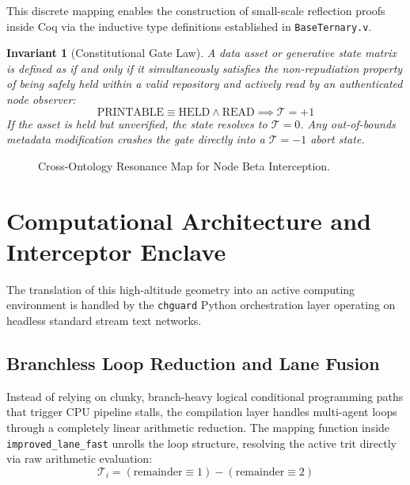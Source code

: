 \documentclass[11pt,oneside,letterpaper]{article}
\newtheorem{invariant}[theorem]{Invariant}
\newcommand{\M}{\mathcal{M}^{80}}
\newcommand{\trit}{\mathcal{T}}
\begin{document}
This discrete mapping enables the construction of small-scale reflection proofs inside Coq via the inductive type definitions established in \texttt{BaseTernary.v}.

\begin{invariant}[Constitutional Gate Law]
A data asset or generative state matrix is defined as  if and only if it simultaneously satisfies the non-repudiation property of being safely held within a valid repository and actively read by an authenticated node observer:
\begin{equation}
\text{PRINTABLE} \equiv \text{HELD} \land \text{READ} \implies \trit = +1
\end{equation}
If the asset is held but unverified, the state resolves to $\trit = 0$. Any out-of-bounds metadata modification crashes the gate directly into a $\trit = -1$ abort state.
\end{invariant}

\begin{figure}[h!]
\centering
{}
\caption{Cross-Ontology Resonance Map for Node Beta Interception.}
\label{fig:resonance}
\end{figure}

\section{Computational Architecture and Interceptor Enclave}
The translation of this high-altitude geometry into an active computing environment is handled by the \texttt{chguard} Python orchestration layer operating on headless standard stream text networks.

\subsection{Branchless Loop Reduction and Lane Fusion}
Instead of relying on clunky, branch-heavy logical conditional programming paths that trigger CPU pipeline stalls, the compilation layer handles multi-agent loops through a completely linear arithmetic reduction. The mapping function inside \texttt{improved_lane_fast} unrolls the loop structure, resolving the active trit directly via raw arithmetic evaluation:
\begin{equation}
\trit_i = (\text{remainder} \equiv 1) - (\text{remainder} \equiv 2)
\end{equation}
\end{document}
